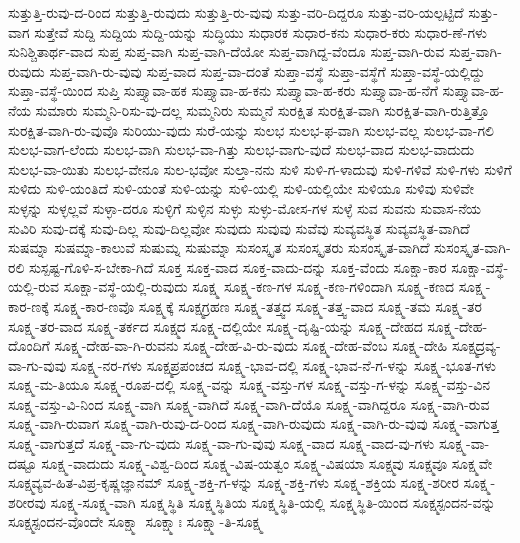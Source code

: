 {ಸುತ್ತುತ್ತಿ-ರುವು-ದ-ರಿಂದ
ಸುತ್ತುತ್ತಿ-ರುವುದು
ಸುತ್ತುತ್ತಿ-ರು-ವುವು
ಸುತ್ತು-ವರಿ-ದಿದ್ದರೂ
ಸುತ್ತು-ವರಿ-ಯಲ್ಪಟ್ಟಿದೆ
ಸುತ್ತು-ವಾಗ
ಸುತ್ತೇವೆ
ಸುದ್ದಿ
ಸುದ್ದಿಯ
ಸುದ್ದಿ-ಯನ್ನು
ಸುದ್ಧಿಯು
ಸುಧಾರಕ
ಸುಧಾರ-ಕನು
ಸುಧಾರ-ಕರು
ಸುಧಾರ-ಣೆ-ಗಳು
ಸುನಿಶ್ಚಿತಾರ್ಥ-ವಾದ
ಸುಪ್ತ
ಸುಪ್ತ-ವಾಗಿ
ಸುಪ್ತ-ವಾಗಿ-ದೆಯೋ
ಸುಪ್ತ-ವಾಗಿದ್ದ-ವೆಂದೂ
ಸುಪ್ತ-ವಾಗಿ-ರುವ
ಸುಪ್ತ-ವಾಗಿ-ರುವುದು
ಸುಪ್ತ-ವಾಗಿ-ರು-ವುವು
ಸುಪ್ತ-ವಾದ
ಸುಪ್ತ-ವಾ-ದಂತೆ
ಸುಪ್ತಾ-ವಸ್ಥೆ
ಸುಪ್ತಾ-ವಸ್ಥೆಗೆ
ಸುಪ್ತಾ-ವಸ್ಥೆ-ಯಲ್ಲಿದ್ದು
ಸುಪ್ತಾ-ವಸ್ಥೆ-ಯಿಂದ
ಸುಪ್ತಿ
ಸುಪ್ತ್ಯಾವಾ-ಹಕ
ಸುಪ್ತ್ಯಾವಾ-ಹ-ಕನು
ಸುಪ್ತ್ಯಾವಾ-ಹ-ಕರು
ಸುಪ್ತ್ಯಾವಾ-ಹ-ನೆಗೆ
ಸುಪ್ತ್ಯಾವಾ-ಹ-ನೆಯ
ಸುಮಾರು
ಸುಮ್ಮನಿ-ರಿಸು-ವು-ದಲ್ಲ
ಸುಮ್ಮನಿರು
ಸುಮ್ಮನೆ
ಸುರಕ್ಷಿತ
ಸುರಕ್ಷಿತ-ವಾಗಿ
ಸುರಕ್ಷಿತ-ವಾಗಿ-ರುತ್ತಿತ್ತೊ
ಸುರಕ್ಷಿತ-ವಾಗಿ-ರು-ವುವೊ
ಸುರಿಯು-ವುದು
ಸುರೆ-ಯನ್ನು
ಸುಲಭ
ಸುಲಭ-ಫ-ವಾಗಿ
ಸುಲಭ-ವಲ್ಲ
ಸುಲಭ-ವಾ-ಗಲಿ
ಸುಲಭ-ವಾಗ-ಲೆಂದು
ಸುಲಭ-ವಾಗಿ
ಸುಲಭ-ವಾ-ಗಿತ್ತು
ಸುಲಭ-ವಾಗು-ವುದೆ
ಸುಲಭ-ವಾದ
ಸುಲಭ-ವಾದುದು
ಸುಲಭ-ವಾ-ಯಿತು
ಸುಲಭ-ವೇನೂ
ಸುಲ-ಭವೋ
ಸುಲ್ತಾ-ನನು
ಸುಳಿ
ಸುಳಿ-ಗ-ಳಾದುವು
ಸುಳಿ-ಗಳಿವೆ
ಸುಳಿ-ಗಳು
ಸುಳಿಗೆ
ಸುಳಿದು
ಸುಳಿ-ಯಂತಿದೆ
ಸುಳಿ-ಯಂತೆ
ಸುಳಿ-ಯನ್ನು
ಸುಳಿ-ಯಲ್ಲಿ
ಸುಳಿ-ಯಲ್ಲಿಯೇ
ಸುಳಿಯೂ
ಸುಳಿವು
ಸುಳಿವೇ
ಸುಳ್ಳನ್ನು
ಸುಳ್ಳಲ್ಲವೆ
ಸುಳ್ಳಾ-ದರೂ
ಸುಳ್ಳಿಗೆ
ಸುಳ್ಳಿನ
ಸುಳ್ಳು
ಸುಳ್ಳು-ಮೋಸ-ಗಳ
ಸುಳ್ಳೆ
ಸುವ
ಸುವನು
ಸುವಾಸ-ನೆಯ
ಸುವಿರಿ
ಸುವು-ದಕ್ಕೆ
ಸುವು-ದಿಲ್ಲ
ಸುವು-ದಿಲ್ಲವೋ
ಸುವುದು
ಸುವುವು
ಸುವೆವು
ಸುವ್ಯವಸ್ಥಿತ
ಸುವ್ಯವಸ್ಥಿತ-ವಾಗಿದೆ
ಸುಷಮ್ನಾ
ಸುಷಮ್ನಾ-ಕಾಲುವೆ
ಸುಷುಮ್ನ
ಸುಷುಮ್ನಾ
ಸುಸಂಸ್ಕೃತ
ಸುಸಂಸ್ಕೃತರು
ಸುಸಂಸ್ಕೃತ-ವಾಗಿದೆ
ಸುಸಂಸ್ಕೃತ-ವಾಗಿ-ರಲಿ
ಸುಸ್ಪಷ್ಟ-ಗೊಳಿ-ಸ-ಬೇಕಾ-ಗಿದೆ
ಸೂಕ್ತ
ಸೂಕ್ತ-ವಾದ
ಸೂಕ್ತ-ವಾದು-ದನ್ನು
ಸೂಕ್ತ-ವೆಂದು
ಸೂಕ್ಷಾ-ಕಾರ
ಸೂಕ್ಷಾ-ವಸ್ಥೆ-ಯಲ್ಲಿ-ರುವ
ಸೂಕ್ಷಾ-ವಸ್ಥೆ-ಯಲ್ಲಿ-ರುವುದು
ಸೂಕ್ಷ್ಮ
ಸೂಕ್ಷ್ಮ-ಕಣ-ಗಳ
ಸೂಕ್ಷ್ಮ-ಕಣ-ಗಳಿಂದಾಗಿ
ಸೂಕ್ಷ್ಮ-ಕಣದ
ಸೂಕ್ಷ್ಮ-ಕಾರ-ಣಕ್ಕೆ
ಸೂಕ್ಷ್ಮ-ಕಾರ-ಣವೊ
ಸೂಕ್ಷ್ಮಕ್ಕೆ
ಸೂಕ್ಷ್ಮಗ್ರಹಣ
ಸೂಕ್ಷ್ಮ-ತತ್ತ್ವದ
ಸೂಕ್ಷ್ಮ-ತತ್ತ್ವ-ವಾದ
ಸೂಕ್ಷ್ಮ-ತಮ
ಸೂಕ್ಷ್ಮ-ತರ
ಸೂಕ್ಷ್ಮ-ತರ-ವಾದ
ಸೂಕ್ಷ್ಮ-ತರ್ಕದ
ಸೂಕ್ಷ್ಮದ
ಸೂಕ್ಷ್ಮ-ದಲ್ಲಿಯೇ
ಸೂಕ್ಷ್ಮ-ದೃಷ್ಟಿ-ಯನ್ನು
ಸೂಕ್ಷ್ಮ-ದೇಹದ
ಸೂಕ್ಷ್ಮ-ದೇಹ-ದೊಂದಿಗೆ
ಸೂಕ್ಷ್ಮ-ದೇಹ-ವಾ-ಗಿ-ರುವನು
ಸೂಕ್ಷ್ಮ-ದೇಹ-ವಿ-ರು-ವುದು
ಸೂಕ್ಷ್ಮ-ದೇಹ-ವೆಂಬ
ಸೂಕ್ಷ್ಮ-ದೇಹಿ
ಸೂಕ್ಷ್ಮದ್ರವ್ಯ-ವಾ-ಗು-ವುವು
ಸೂಕ್ಷ್ಮ-ನರ-ಗಳು
ಸೂಕ್ಷ್ಮಪ್ರಪಂಚದ
ಸೂಕ್ಷ್ಮ-ಭಾವ-ದಲ್ಲಿ
ಸೂಕ್ಷ್ಮ-ಭಾವ-ನೆ-ಗ-ಳನ್ನು
ಸೂಕ್ಷ್ಮ-ಭೂತ-ಗಳು
ಸೂಕ್ಷ್ಮ-ಮ-ತಿಯೂ
ಸೂಕ್ಷ್ಮ-ರೂಪ-ದಲ್ಲಿ
ಸೂಕ್ಷ್ಮ-ವನ್ನು
ಸೂಕ್ಷ್ಮ-ವಸ್ತು-ಗಳ
ಸೂಕ್ಷ್ಮ-ವಸ್ತು-ಗ-ಳನ್ನು
ಸೂಕ್ಷ್ಮ-ವಸ್ತು-ವಿನ
ಸೂಕ್ಷ್ಮ-ವಸ್ತು-ವಿ-ನಿಂದ
ಸೂಕ್ಷ್ಮ-ವಾಗಿ
ಸೂಕ್ಷ್ಮ-ವಾಗಿದೆ
ಸೂಕ್ಷ್ಮ-ವಾಗಿ-ದೆಯೊ
ಸೂಕ್ಷ್ಮ-ವಾಗಿದ್ದರೂ
ಸೂಕ್ಷ್ಮ-ವಾಗಿ-ರುವ
ಸೂಕ್ಷ್ಮ-ವಾಗಿ-ರುವಾಗ
ಸೂಕ್ಷ್ಮ-ವಾಗಿ-ರುವು-ದ-ರಿಂದ
ಸೂಕ್ಷ್ಮ-ವಾಗಿ-ರುವುದು
ಸೂಕ್ಷ್ಮ-ವಾಗಿ-ರು-ವುವು
ಸೂಕ್ಷ್ಮ-ವಾಗುತ್ತ
ಸೂಕ್ಷ್ಮ-ವಾಗುತ್ತದೆ
ಸೂಕ್ಷ್ಮ-ವಾ-ಗು-ವುದು
ಸೂಕ್ಷ್ಮ-ವಾ-ಗು-ವುವು
ಸೂಕ್ಷ್ಮ-ವಾದ
ಸೂಕ್ಷ್ಮ-ವಾದ-ವು-ಗಳು
ಸೂಕ್ಷ್ಮ-ವಾ-ದಷ್ಟೂ
ಸೂಕ್ಷ್ಮ-ವಾದುದು
ಸೂಕ್ಷ್ಮ-ವಿಶ್ವ-ದಿಂದ
ಸೂಕ್ಷ್ಮ-ವಿಷ-ಯತ್ವಂ
ಸೂಕ್ಷ್ಮ-ವಿಷಯಾ
ಸೂಕ್ಷ್ಮವು
ಸೂಕ್ಷ್ಮವೂ
ಸೂಕ್ಷ್ಮವೇ
ಸೂಕ್ಷ್ಮವ್ಯವ-ಹಿತ-ವಿಪ್ರ-ಕೃಷ್ಣಜ್ಞಾನಮ್
ಸೂಕ್ಷ್ಮ-ಶಕ್ತಿ-ಗ-ಳನ್ನು
ಸೂಕ್ಷ್ಮ-ಶಕ್ತಿ-ಗಳು
ಸೂಕ್ಷ್ಮ-ಶಕ್ತಿಯ
ಸೂಕ್ಷ್ಮ-ಶರೀರ
ಸೂಕ್ಷ್ಮ-ಶರೀರವು
ಸೂಕ್ಷ್ಮ-ಸೂಕ್ಷ್ಮ-ವಾಗಿ
ಸೂಕ್ಷ್ಮಸ್ಥಿತಿ
ಸೂಕ್ಷ್ಮಸ್ಥಿತಿಯ
ಸೂಕ್ಷ್ಮಸ್ಥಿತಿ-ಯಲ್ಲಿ
ಸೂಕ್ಷ್ಮಸ್ಥಿತಿ-ಯಿಂದ
ಸೂಕ್ಷ್ಮಸ್ಪಂದನ-ವನ್ನು
ಸೂಕ್ಷ್ಮಸ್ಪಂದನ-ವೊಂದೇ
ಸೂಕ್ಷ್ಮಾ
ಸೂಕ್ಷ್ಮಾಃ
ಸೂಕ್ಷ್ಮಾ-ತಿ-ಸೂಕ್ಷ್ಮ
}

